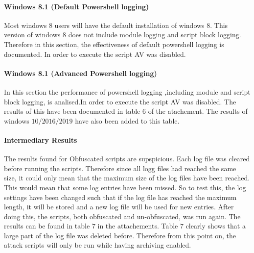 \documentclass{article}%
\begin{document}
\paragraph{Windows 8.1 (Default Powershell logging)}\hfill\newline
Most windows $8$ users will have the default installation of windows 8. This version of windows $8$ does not include module logging and script block logging. Therefore in this section, the effectiveness of default powershell logging is documented.
In order to execute the script AV was disabled.

\paragraph{Windows 8.1 (Advanced Powershell logging)}\hfill\newline
In this section the performance of powershell logging ,including module and script block logging, is analised.In order to execute the script AV was disabled.
The results of this have been documented in table $6$ of the atachement. The results of windows $10/2016/2019$ have also been added to this table.

\paragraph{Intermediary Results}\hfill\newline
The results found for Obfuscated scripts are supspicious. Each log file was cleared before running the scripts. Therefore since all logg files had reached the same size, it could only mean that the maximum size of the log files have been reached. This would mean that some log entries have been missed. So to test this, the log settings have been changed such that if the log file has reached the maximum length, it will be stored and a new log file will be used for new entries. After doing this, the scripts, both obfuscated and un-obfuscated, was run again. The results can be found in table $7$ in the attachements. Table $7$ clearly shows that a large part of the log file was deleted before. Therefore from this point on, the attack scripts will only be run while having archiving enabled.
\end{document}
